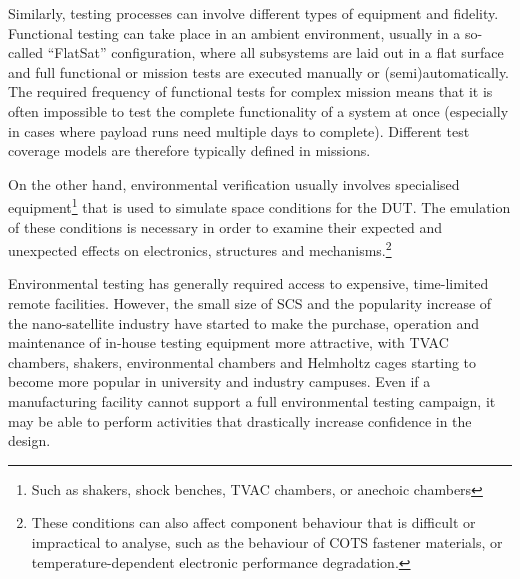 \documentclass[a4paper,nobib,justified,final]{tufte-book}
\begin{document}
Similarly, testing processes can involve different types of equipment and fidelity. Functional testing can take place in an ambient environment, usually in a so-called ``FlatSat'' configuration, where all subsystems are laid out in a flat surface and full functional or mission  tests are executed manually or (semi)automatically.
The required frequency of functional tests for complex mission means that it is often impossible to test the complete functionality of a system at once (especially in cases where payload runs need multiple days to complete). Different test coverage models are therefore typically defined in missions.


On the other hand, environmental verification usually involves specialised equipment\footnote{Such as shakers, shock benches, \ac{TVAC} chambers, or anechoic chambers} that is used to simulate space conditions for the \ac{DUT}.
The emulation of these conditions is necessary in order to examine their expected and unexpected effects on electronics, structures and mechanisms.\footnote{These conditions can also affect component behaviour that is difficult or impractical to analyse, such as the behaviour of \acs{COTS} fastener materials, or temperature-dependent electronic performance degradation.}

Environmental testing has generally required access to expensive, time-limited remote facilities.
However, the small size of \acs{SCS} and the popularity increase of the nano-satellite industry have started to make the purchase, operation and maintenance of in-house testing equipment more attractive, with \ac{TVAC} chambers, shakers, environmental chambers and Helmholtz cages starting to become more popular in university and industry campuses. %
Even if a manufacturing facility cannot support a full environmental testing campaign, it may be able to perform activities that drastically increase confidence in the design.
\end{document}
